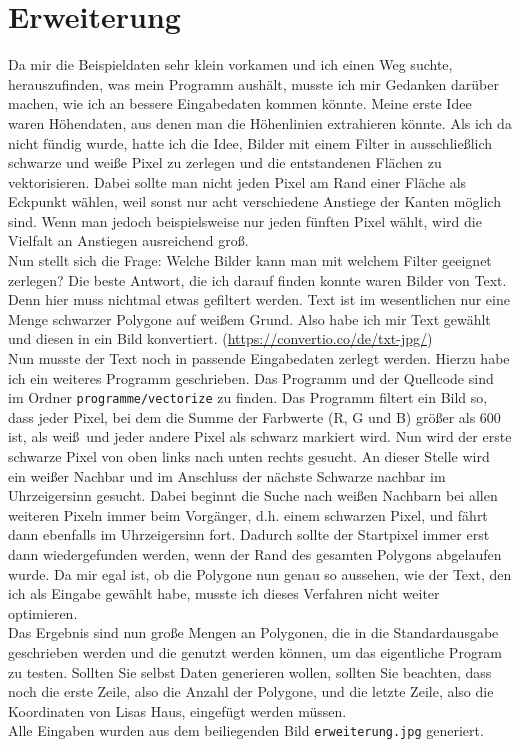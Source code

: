 \documentclass[a4paper,10pt,ngerman]{scrartcl}
\begin{document}
\section{Erweiterung}
Da mir die Beispieldaten sehr klein vorkamen und ich einen Weg suchte, herauszufinden, was mein Programm aushält, musste ich mir Gedanken darüber machen, wie ich an bessere Eingabedaten kommen könnte. Meine erste Idee waren Höhendaten, aus denen man die Höhenlinien extrahieren könnte. Als ich da nicht fündig wurde, hatte ich die Idee, Bilder mit einem Filter in ausschließlich schwarze und weiße Pixel zu zerlegen und die entstandenen Flächen zu vektorisieren. Dabei sollte man nicht jeden Pixel am Rand einer Fläche als Eckpunkt wählen, weil sonst nur acht verschiedene Anstiege der Kanten möglich sind. Wenn man jedoch beispielsweise nur jeden fünften Pixel wählt, wird die Vielfalt an Anstiegen ausreichend gro\ss .\\
Nun stellt sich die Frage: Welche Bilder kann man mit welchem Filter geeignet zerlegen? Die beste Antwort, die ich darauf finden konnte waren Bilder von Text. Denn hier muss nichtmal etwas gefiltert werden. Text ist im wesentlichen nur eine Menge schwarzer Polygone auf weißem Grund. Also habe ich mir Text gewählt und diesen in ein Bild konvertiert. (\url{https://convertio.co/de/txt-jpg/})\\
Nun musste der Text noch in passende Eingabedaten zerlegt werden. Hierzu habe ich ein weiteres Programm geschrieben. Das Programm und der Quellcode sind im Ordner \texttt{programme/vectorize} zu finden. Das Programm filtert ein Bild so, dass jeder Pixel, bei dem die Summe der Farbwerte (R, G und B) grö\ss er als 600 ist, als wei\ss\ und jeder andere Pixel als schwarz markiert wird. Nun wird der erste schwarze Pixel von oben links nach unten rechts gesucht. An dieser Stelle wird ein wei\ss er Nachbar und im Anschluss der nächste Schwarze nachbar im Uhrzeigersinn gesucht. Dabei beginnt die Suche nach weißen Nachbarn bei allen weiteren Pixeln immer beim Vorgänger, d.h. einem schwarzen Pixel, und fährt dann ebenfalls im Uhrzeigersinn fort. Dadurch sollte der Startpixel immer erst dann wiedergefunden werden, wenn der Rand des gesamten Polygons abgelaufen wurde. Da mir egal ist, ob die Polygone nun genau so aussehen, wie der Text, den ich als Eingabe gewählt habe, musste ich dieses Verfahren nicht weiter optimieren.\\
Das Ergebnis sind nun große Mengen an Polygonen, die in die Standardausgabe geschrieben werden und die genutzt werden können, um das eigentliche Program zu testen. Sollten Sie selbst Daten generieren wollen, sollten Sie beachten, dass noch die erste Zeile, also die Anzahl der Polygone, und die letzte Zeile, also die Koordinaten von Lisas Haus, eingefügt werden müssen.\\
Alle Eingaben wurden aus dem beiliegenden Bild \texttt{erweiterung.jpg} generiert.
\end{document}
